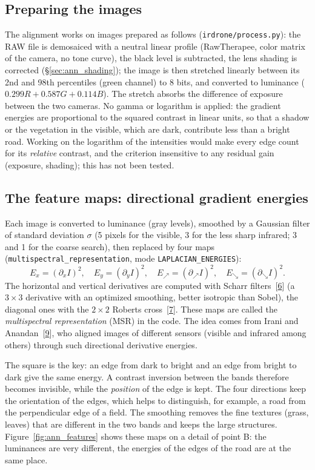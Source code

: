 \documentclass[a4paper,11pt]{report}
\begin{document}
\subsection{Preparing the images}\label{sec:ann_preparation}
The alignment works on images prepared as follows (\texttt{irdrone/process.py}): the RAW file is demosaiced with a neutral linear profile (RawTherapee, color matrix of the camera, no tone curve), the black level is subtracted, the lens shading is corrected (\S\ref{sec:ann_shading}); the image is then stretched linearly between its 2nd and 98th percentiles (green channel) to 8 bits, and converted to luminance ($0.299R + 0.587G + 0.114B$). The stretch absorbs the difference of exposure between the two cameras. No gamma or logarithm is applied: the gradient energies are proportional to the squared contrast in linear units, so that a shadow or the vegetation in the visible, which are dark, contribute less than a bright road. Working on the logarithm of the intensities would make every edge count for its \emph{relative} contrast, and the criterion insensitive to any residual gain (exposure, shading); this has not been tested.

\subsection{The feature maps: directional gradient energies}\label{sec:ann_msr}
Each image is converted to luminance (gray levels), smoothed by a Gaussian filter of standard deviation $\sigma$ (5 pixels for the visible, 3 for the less sharp infrared; 3 and 1 for the coarse search), then replaced by four maps (\texttt{multispectral\_representation}, mode \texttt{LAPLACIAN\_ENERGIES}):
\begin{equation}
	E_x = (\partial_x I)^2, \quad E_y = (\partial_y I)^2, \quad E_{\nearrow} = (\partial_{\nearrow} I)^2, \quad E_{\searrow} = (\partial_{\searrow} I)^2.
\end{equation}
The horizontal and vertical derivatives are computed with Scharr filters~[\hyperref[ann_scharr]{6}] (a $3 \times 3$ derivative with an optimized smoothing, better isotropic than Sobel), the diagonal ones with the $2 \times 2$ Roberts cross~[\hyperref[ann_roberts]{7}]. These maps are called the \emph{multispectral representation} (MSR) in the code. The idea comes from Irani and Anandan~[\hyperref[ann_irani]{9}], who aligned images of different sensors (visible and infrared among others) through such directional derivative energies.

The square is the key: an edge from dark to bright and an edge from bright to dark give the same energy. A contrast inversion between the bands therefore becomes invisible, while the \emph{position} of the edge is kept. The four directions keep the orientation of the edges, which helps to distinguish, for example, a road from the perpendicular edge of a field. The smoothing removes the fine textures (grass, leaves) that are different in the two bands and keeps the large structures. Figure~\ref{fig:ann_features} shows these maps on a detail of point B: the luminances are very different, the energies of the edges of the road are at the same place.
\end{document}
